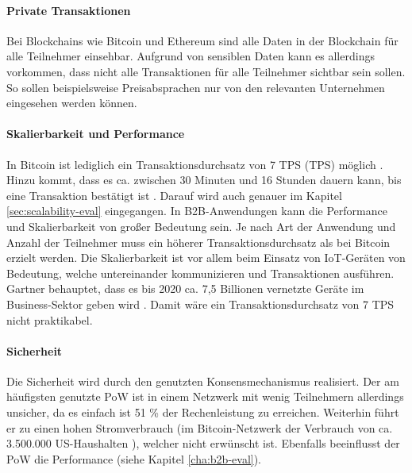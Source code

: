 \paragraph{Private Transaktionen}
Bei Blockchains wie Bitcoin und Ethereum sind alle Daten in der Blockchain für alle Teilnehmer einsehbar. Aufgrund von sensiblen Daten kann es allerdings vorkommen, dass nicht alle Transaktionen für alle Teilnehmer sichtbar sein sollen. So sollen beispielsweise Preisabsprachen nur von den relevanten Unternehmen eingesehen werden können.

\paragraph{Skalierbarkeit und Performance}
In Bitcoin ist lediglich ein Transaktionsdurchsatz von 7 \acl{TPS} (\acs{TPS}) möglich \cite{ZhengBlockchainChallengesOpportunities2017}. Hinzu kommt, dass es ca. zwischen 30 Minuten und 16 Stunden dauern kann, bis eine Transaktion bestätigt ist \cite{BuchkoHowLongBitcoin2017}. Darauf wird auch genauer im Kapitel \ref{sec:scalability-eval} eingegangen. In B2B-Anwendungen kann die Performance und Skalierbarkeit von großer Bedeutung sein. Je nach Art der Anwendung und Anzahl der Teilnehmer muss ein höherer Transaktionsdurchsatz als bei Bitcoin erzielt werden. Die Skalierbarkeit ist vor allem beim Einsatz von IoT-Geräten von Bedeutung, welche untereinander kommunizieren und Transaktionen ausführen. Gartner behauptet, dass es bis 2020 ca. 7,5 Billionen vernetzte Geräte im Business-Sektor geben wird \cite{RobGartnerSaysBillion2017}. Damit wäre ein Transaktionsdurchsatz von 7 TPS nicht praktikabel.

\paragraph{Sicherheit}
Die Sicherheit wird durch den genutzten Konsensmechanismus realisiert. Der am häufigsten genutzte \acs{PoW} ist in einem Netzwerk mit wenig Teilnehmern allerdings unsicher, da es einfach ist 51 \% der Rechenleistung zu erreichen. Weiterhin führt er zu einen hohen Stromverbrauch (im Bitcoin-Netzwerk der Verbrauch von ca. 3.500.000 US-Haushalten \cite{DigiconomistBitcoinEnergyConsumption}), welcher nicht erwünscht ist. Ebenfalls beeinflusst der \acs{PoW} die Performance (siehe Kapitel \ref{cha:b2b-eval}).



